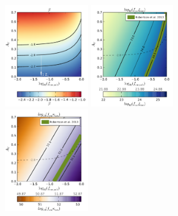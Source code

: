 \begin{figure}
\centering
  \includegraphics[width=0.33\textwidth]{plots/Fig6a.pdf}
  \includegraphics[width=0.33\textwidth]{plots/Fig6b.pdf}
  \includegraphics[width=0.33\textwidth]{plots/Fig6c.pdf}


\end{figure}
